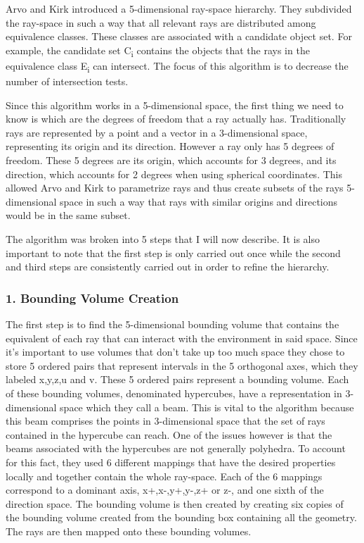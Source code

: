 Arvo and Kirk \cite{Arvo87} introduced a 5-dimensional ray-space hierarchy. They subdivided the ray-space in such a way that all relevant rays are distributed among equivalence classes. These classes are associated with a candidate object set. For example, the candidate set C\textsubscript{i} contains the objects that the rays in the equivalence class E\textsubscript{i} can intersect. The focus of this algorithm is to decrease the number of intersection tests.

\medskip

Since this algorithm works in a 5-dimensional space, the first thing we need to know is which are the degrees of freedom that a ray actually has. Traditionally rays are represented by a point and a vector in a 3-dimensional space, representing its origin and its direction. However a ray only has 5 degrees of freedom. These 5 degrees are its origin, which accounts for 3 degrees, and its direction, which accounts for 2 degrees when using spherical coordinates. This allowed Arvo and Kirk to parametrize rays and thus create subsets of the rays 5-dimensional space in such a way that rays with similar origins and directions would be in the same subset. 

\medskip

The algorithm was broken into 5 steps that I will now describe. It is also important to note that the first step is only carried out once while the second and third steps are consistently carried out in order to refine the hierarchy.

\subsubsection{1. Bounding Volume Creation}

The first step is to find the 5-dimensional bounding volume that contains the equivalent of each ray that can interact with the environment in said space. Since it's important to use volumes that don't take up too much space they chose to store 5 ordered pairs that represent intervals in the 5 orthogonal axes, which they labeled x,y,z,u and v. These 5 ordered pairs represent a bounding volume. Each of these bounding volumes, denominated hypercubes, have a representation in 3-dimensional space which they call a beam. This is vital to the algorithm because this beam comprises the points in 3-dimensional space that the set of rays contained in the hypercube can reach. One of the issues however is that the beams associated with the hypercubes are not generally polyhedra. To account for this fact, they used 6 different mappings that have the desired properties locally and together contain the whole ray-space. Each of the 6 mappings correspond to a dominant axis, x+,x-,y+,y-,z+ or z-, and one sixth of the direction space. The bounding volume is then created by creating six copies of the bounding volume created from the bounding box containing all the geometry. The rays are then mapped onto these bounding volumes.

